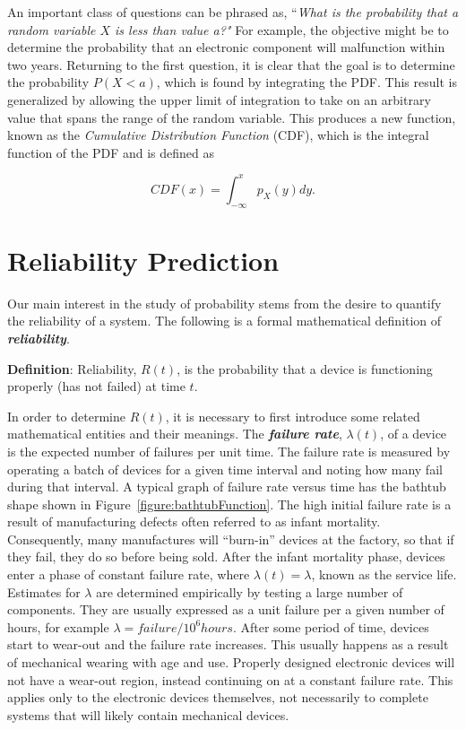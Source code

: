 {An important class of questions can be phrased as, ``\emph{What is the
probability that a random variable $X$ is less than value a?"} For
example, the objective might be to determine the probability that an
electronic component will malfunction within two years. Returning to the
first question, it is clear that the goal is to determine the
probability $P(X<a)$, which is found by
integrating the PDF. This result is generalized by allowing the upper
limit of integration to take on an arbitrary value that spans the range
of the random variable. This produces a new function, known as the
\emph{Cumulative Distribution Function} (CDF), which is the integral
function of the PDF and is defined as

\begin{equation}
\label{equ:exponentialDensity}
CDF(x) = \int^x_{-\infty} p_X(y)dy.
\end{equation}

\section{Reliability Prediction}
\label{section:reliability-prediction}

Our main interest in the study of probability stems from the desire to
quantify the reliability of a system. The following is a formal
mathematical definition of \emph{\textbf{reliability}}.

\begin{itquote}
\textbf{Definition}: Reliability, $R(t)$, is the probability that a
device is functioning properly (has not failed) at time $t$.
\end{itquote}

In order to determine $R(t)$, it is necessary to first introduce
some related mathematical entities and their meanings. The
\emph{\textbf{failure rate}}, $\lambda(t)$, of a device is the expected
number of failures per unit time. The failure rate is measured by
operating a batch of devices for a given time interval and noting how
many fail during that interval. A typical graph of failure rate versus
time has the bathtub shape shown in Figure~\ref{figure:bathtubFunction}. 
The high initial failure
rate is a result of manufacturing defects often referred to as infant
mortality. Consequently, many manufactures will ``burn-in'' devices at
the factory, so that if they fail, they do so before being sold. After
the infant mortality phase, devices enter a phase of constant failure
rate, where $\lambda(t) = \lambda$, known as the service life. Estimates for
$\lambda$ are determined empirically by testing a large number of
components. They are usually expressed as a unit failure per a given
number of hours, for example $\lambda  = failure/10^6 hours$.
After some period of time, devices start to wear-out and the failure
rate increases. This usually happens as a result of mechanical wearing
with age and use. Properly designed electronic devices will not have a
wear-out region, instead continuing on at a constant failure rate. This
applies only to the electronic devices themselves, not necessarily to
complete systems that will likely contain mechanical devices.

}
